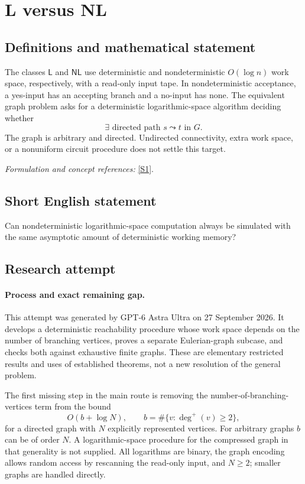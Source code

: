 \documentclass[11pt]{article}
\begin{document}
\section*{\texorpdfstring{L versus NL}{L versus NL}}\label{statement}
\subsection{Definitions and mathematical statement}
The classes $\mathsf L$ and $\mathsf{NL}$ use deterministic and nondeterministic $O(\log n)$ work space, respectively, with a read-only input tape. In nondeterministic acceptance, a yes-input has an accepting branch and a no-input has none. The equivalent graph problem asks for a deterministic logarithmic-space algorithm deciding whether
\[
 \exists\text{ directed path }s\leadsto t\text{ in }G.
\]
The graph is arbitrary and directed. Undirected connectivity, extra work space, or a nonuniform circuit procedure does not settle this target.
\par\smallskip\textit{Formulation and concept references:} \href{https://drops.dagstuhl.de/storage/00lipics/lipics-vol099-socg2018/LIPIcs.SoCG.2018/LIPIcs.SoCG.2018.pdf}{[S1]}.

\subsection{Short English statement}
Can nondeterministic logarithmic-space computation always be simulated with the same asymptotic amount of deterministic working memory?
\subsection{Research attempt}
\paragraph{Process and exact remaining gap.}
This attempt was generated by GPT-6 Astra Ultra on 27 September 2026. It develops a deterministic reachability procedure whose work space depends on the number of branching vertices, proves a separate Eulerian-graph subcase, and checks both against exhaustive finite graphs. These are elementary restricted results and uses of established theorems, not a new resolution of the general problem.

The first missing step in the main route is removing the number-of-branching-vertices term from the bound
\[
 O(b+\log N),\qquad
 b=\#\{v:\deg^+(v)\ge2\},
 \tag{99.1}
\]
for a directed graph with $N$ explicitly represented vertices. For arbitrary graphs $b$ can be of order $N$. A logarithmic-space procedure for the compressed graph in that generality is not supplied. All logarithms are binary, the graph encoding allows random access by rescanning the read-only input, and $N\ge2$; smaller graphs are handled directly.
\end{document}
